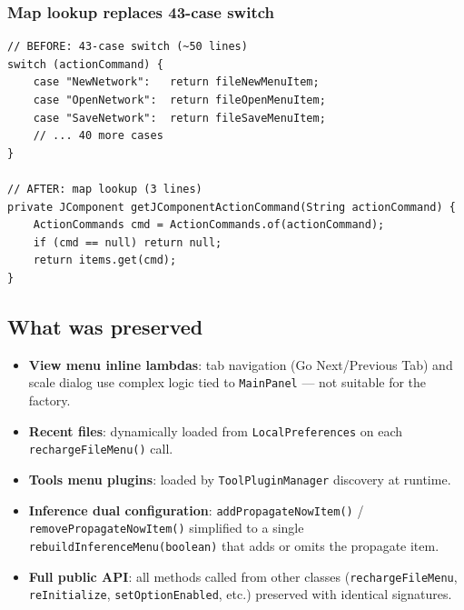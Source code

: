 \documentclass[12pt,a4paper]{article}
\newcommand{\cls}[1]{\texttt{#1}}
\newcommand{\meth}[1]{\texttt{#1}}
\begin{document}
\subsubsection{Map lookup replaces 43-case switch}

\begin{lstlisting}[caption={Item lookup --- before vs. after}]
// BEFORE: 43-case switch (~50 lines)
switch (actionCommand) {
    case "NewNetwork":   return fileNewMenuItem;
    case "OpenNetwork":  return fileOpenMenuItem;
    case "SaveNetwork":  return fileSaveMenuItem;
    // ... 40 more cases
}

// AFTER: map lookup (3 lines)
private JComponent getJComponentActionCommand(String actionCommand) {
    ActionCommands cmd = ActionCommands.of(actionCommand);
    if (cmd == null) return null;
    return items.get(cmd);
}
\end{lstlisting}

\subsection{What was preserved}

\begin{itemize}[nosep]
  \item \textbf{View menu inline lambdas}: tab navigation
        (Go Next/Previous Tab) and scale dialog use complex logic
        tied to \cls{MainPanel} --- not suitable for the factory.
  \item \textbf{Recent files}: dynamically loaded from
        \cls{LocalPreferences} on each \meth{rechargeFileMenu()} call.
  \item \textbf{Tools menu plugins}: loaded by \cls{ToolPluginManager}
        discovery at runtime.
  \item \textbf{Inference dual configuration}:
        \meth{addPropagateNowItem()} /
        \meth{removePropagateNowItem()} simplified to a single
        \meth{rebuildInferenceMenu(boolean)} that adds or omits the
        propagate item.
  \item \textbf{Full public API}: all methods called from other
        classes (\meth{rechargeFileMenu}, \meth{reInitialize},
        \meth{setOptionEnabled}, etc.) preserved with identical
        signatures.
\end{itemize}

\end{document}
